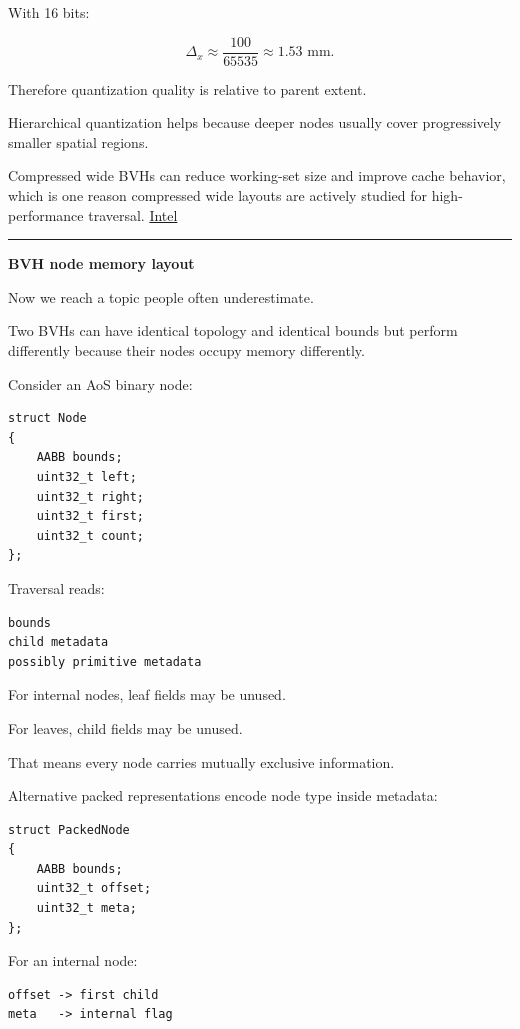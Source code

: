 With 16 bits:

\[
\Delta_x\approx
\frac{100}{65535}
\approx1.53\text{ mm}.
\]

Therefore quantization quality is relative to parent extent.

Hierarchical quantization helps because deeper nodes usually cover progressively smaller spatial regions.

Compressed wide BVHs can reduce working-set size and improve cache behavior, which is one reason compressed wide layouts are actively studied for high-performance traversal. \href{https://www.intel.com/content/dam/develop/external/us/en/documents/wide-bvh-traversal-with-a-short-stack-837099.pdf?utm_source=chatgpt.com}{Intel}

\begin{center}\rule{0.5\linewidth}{0.5pt}\end{center}

\textbf{BVH node memory layout}

Now we reach a topic people often underestimate.

Two BVHs can have identical topology and identical bounds but perform differently because their nodes occupy memory differently.

Consider an AoS binary node:

\begin{verbatim}
struct Node
{
    AABB bounds;
    uint32_t left;
    uint32_t right;
    uint32_t first;
    uint32_t count;
};
\end{verbatim}

Traversal reads:

\begin{verbatim}
bounds
child metadata
possibly primitive metadata
\end{verbatim}

For internal nodes, leaf fields may be unused.

For leaves, child fields may be unused.

That means every node carries mutually exclusive information.

Alternative packed representations encode node type inside metadata:

\begin{verbatim}
struct PackedNode
{
    AABB bounds;
    uint32_t offset;
    uint32_t meta;
};
\end{verbatim}

For an internal node:

\begin{verbatim}
offset -> first child
meta   -> internal flag
\end{verbatim}

